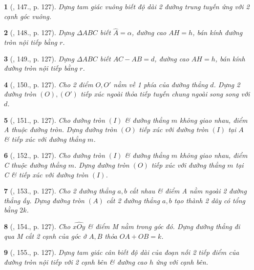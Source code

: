 \documentclass{article}
\newtheorem{baitoan}{}
\begin{document}
\begin{baitoan}[\cite{Binh_Toan_9_tap_1}, 147., p. 127]
	Dựng tam giác vuông biết độ dài 2 đường trung tuyến ứng với 2 cạnh góc vuông.
\end{baitoan}

\begin{baitoan}[\cite{Binh_Toan_9_tap_1}, 148., p. 127]
	Dựng $\Delta ABC$ biết $\widehat{A} = \alpha$, đường cao $AH = h$, bán kính đường tròn nội tiếp bằng $r$.
\end{baitoan}

\begin{baitoan}[\cite{Binh_Toan_9_tap_1}, 149., p. 127]
	Dựng $\Delta ABC$ biết $AC - AB = d$, đường cao $AH = h$, bán kính đường tròn nội tiếp bằng $r$.
\end{baitoan}

\begin{baitoan}[\cite{Binh_Toan_9_tap_1}, 150., p. 127]
	Cho 2 điểm $O,O'$ nằm về 1 phía của đường thẳng $d$. Dựng 2 đường tròn $(O),(O')$ tiếp xúc ngoài thỏa tiếp tuyến chung ngoài song song với $d$.
\end{baitoan}

\begin{baitoan}[\cite{Binh_Toan_9_tap_1}, 151., p. 127]
	Cho đường tròn $(I)$ \& đường thẳng $m$ không giao nhau, điểm A thuộc đường tròn. Dựng đường tròn $(O)$ tiếp xúc với đường tròn $(I)$ tại $A$ \& tiếp xúc với đường thẳng $m$.
\end{baitoan}

\begin{baitoan}[\cite{Binh_Toan_9_tap_1}, 152., p. 127]
	Cho đường tròn $(I)$ \& đường thẳng $m$ không giao nhau, điểm C thuộc đường thẳng $m$. Dựng đường tròn $(O)$ tiếp xúc với đường thẳng $m$ tại C \& tiếp xúc với đường tròn $(I)$.
\end{baitoan}

\begin{baitoan}[\cite{Binh_Toan_9_tap_1}, 153., p. 127]
	Cho 2 đường thẳng $a,b$ cắt nhau \& điểm A nằm ngoài 2 đường thẳng ấy. Dựng đường tròn $(A)$ cắt 2 đường thẳng $a,b$ tạo thành 2 dây có tổng bằng $2k$.
\end{baitoan}

\begin{baitoan}[\cite{Binh_Toan_9_tap_1}, 154., p. 127]
	Cho $\widehat{xOy}$ \& điểm M nằm trong góc đó. Dựng đường thẳng đi qua M cắt 2 cạnh của góc ở $A,B$ thỏa $OA + OB = k$.
\end{baitoan}

\begin{baitoan}[\cite{Binh_Toan_9_tap_1}, 155., p. 127]
	Dựng tam giác cân biết độ dài của đoạn nối 2 tiếp điểm của đường tròn nội tiếp với 2 cạnh bên \& đường cao $h$ ứng với cạnh bên.
\end{baitoan}
\end{document}
